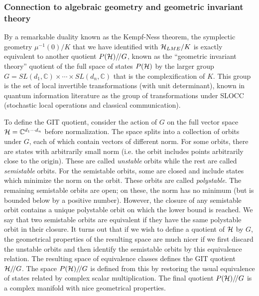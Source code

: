 \documentclass[12pt]{article}
\theoremstyle{definition}
\newcommand{\GITquot}{/\!/}
\begin{document}
\subsubsection*{Connection to algebraic geometry and geometric invariant theory}

By a remarkable duality known as the Kempf-Ness theorem, the symplectic geometry $\mu^{-1}(0)/K$ that we have identified with ${\cal H}_{LME}/K$ is exactly equivalent to another quotient $P({\cal H})\GITquot G$, known as the ``geometric invariant theory'' quotient of the full space of states $P({\cal H})$ by the larger group $G = SL(d_1, \mathbb{C}) \times \cdots \times SL(d_n, \mathbb{C})$ that is the complexification of $K$. This group is the set of local invertible transformations (with unit determinant), known in quantum information literature as the group of transformations under SLOCC (stochastic local operations and classical communication).

To define the GIT quotient, consider the action of $G$ on the full vector space ${\cal H} = \mathbb{C}^{d_1 \cdots d_n}$ before normalization. The space splits into a collection of orbits under $G$, each of which contain vectors of different norm. For some orbits, there are states with arbitrarily small norm (i.e. the orbit includes points arbitrarily close to the origin). These are called {\it unstable} orbits while the rest are called {\it semistable} orbits. For the semistable orbits, some are closed and include states which minimize the norm on the orbit. These orbits are called {\it polystable}. The remaining semistable orbits are open; on these, the norm has no minimum (but is bounded below by a positive number). However, the closure of any semistable orbit contains a unique polystable orbit on which the lower bound is reached. We say that two semistable orbits are equivalent if they have the same polystable orbit in their closure. It turns out that if we wish to define a quotient of ${\cal H}$ by $G$, the geometrical properties of the resulting space are much nicer if we first discard the unstable orbits and then identify the semistable orbits by this equivalence relation. The resulting space of equivalence classes defines the GIT quotient ${\cal H}\GITquot G$. The space $P({\cal H})\GITquot G$ is defined from this by restoring the usual equivalence of states related by complex scalar multiplication. The final quotient $P({\cal H})\GITquot G$ is a complex manifold with nice geometrical properties.
\end{document}
